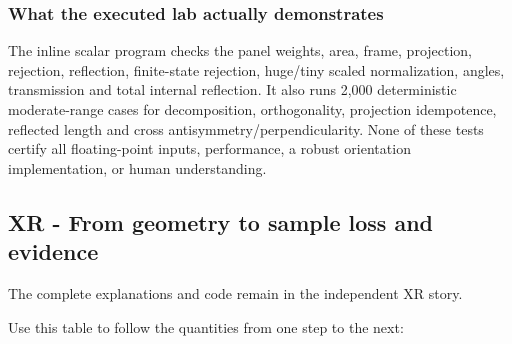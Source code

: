 \subsubsection{What the executed lab actually demonstrates}\label{appendix-92ff77d4dfdc-what-the-executed-lab-actually-demonstrates}

\hypertarget{appendix-92ff77d4dfdc-what-the-executed-lab-actually-demonstrates}{}

The inline scalar program checks the panel weights, area, frame, projection, rejection, reflection, finite-state rejection, huge/tiny scaled normalization, angles, transmission and total internal reflection. It also runs 2,000 deterministic moderate-range cases for decomposition, orthogonality, projection idempotence, reflected length and cross antisymmetry/perpendicularity. None of these tests certify all floating-point inputs, performance, a robust orientation implementation, or human understanding.

\subsection{XR - From geometry to sample loss and evidence}\label{appendix-92ff77d4dfdc-xr---from-geometry-to-sample-loss-and-evidence}

\hypertarget{appendix-92ff77d4dfdc-xr---from-geometry-to-sample-loss-and-evidence}{}

The complete explanations and code remain in {the independent XR story}.

Use this table to follow the quantities from one step to the next:

